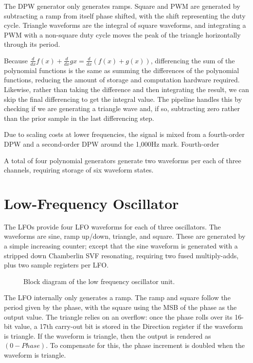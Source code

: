 The DPW generator only generates ramps.  Square and PWM are generated by subtracting a ramp from itself phase shifted, with the shift representing the duty cycle.  Triangle waveforms are the integral of square waveforms, and integrating a PWM with a non-square duty cycle moves the peak of the triangle horizontally through its period.

Because $\frac{d}{dx}f(x)+\frac{d}{dx}g{x}=\frac{d}{dx}(f(x)+g(x))$, differencing the sum of the polynomial functions is the same as summing the differences of the polynomial functions, reducing the amount of storage and computation hardware required.  Likewise, rather than taking the difference and then integrating the result, we can skip the final differencing to get the integral value.  The pipeline handles this by checking if we are generating a triangle wave and, if so, subtracting zero rather than the prior sample in the last differencing step.

Due to scaling costs at lower frequencies, the signal is mixed from a fourth-order DPW and a second-order DPW around the 1,000Hz mark.  Fourth-order

A total of four polynomial generators generate two waveforms per each of three channels, requiring storage of six waveform states.


\section{Low-Frequency Oscillator}

The LFOs provide four LFO waveforms for each of three oscillators.  The waveforms are sine, ramp up/down, triangle, and square.  These are generated by a simple increasing counter; except that the sine waveform is generated with a stripped down Chamberlin SVF resonating, requiring two fused multiply-adds, plus two sample registers per LFO.

\begin{figure}[ht]
    \centering
    
    \caption{\label{fig:lfo-block-diagram} Block diagram of the low frequency oscillator unit.}
\end{figure}

The LFO internally only generates a ramp.  The ramp and square follow the period given by the phase, with the square using the MSB of the phase as the output value.  The triangle relies on an overflow:  once the phase rolls over its 16-bit value, a 17th carry-out bit is stored in the Direction register if the waveform is triangle.  If the waveform is triangle, then the output is rendered as $(0-Phase)$.  To compensate for this, the phase increment is doubled when the waveform is triangle.

